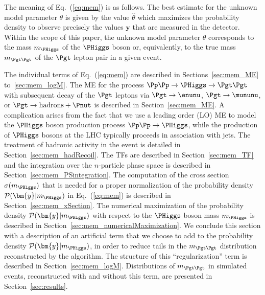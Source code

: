 The meaning of Eq.~(\ref{eq:mem}) is as follows.
The best estimate for the unknown model parameter $\theta$ is given by the
value $\hat{\theta}$ which maximizes the probability density to observe precisely the 
values $\bm{y}$ that are measured in the detector. 
Within the scope of this paper, the unknown model parameter $\theta$
corresponds to the mass $m_{\PHiggs}$ of the $\PHiggs$ boson or,
equivalently, to the true mass $m_{\Pgt\Pgt}$ of the $\Pgt$ lepton
pair in a given event.

The individual terms of Eq.~(\ref{eq:mem}) are described in
Sections~\ref{sec:mem_ME} to~\ref{sec:mem_logM}.
The ME for the process $\Pp\Pp \to \PHiggs \to \Pgt\Pgt$
with subsequent decay of the $\Pgt$ leptons 
via $\Pgt \to \enunu$, $\Pgt \to \mununu$, or $\Pgt \to \textrm{hadrons} + \Pnut$
is described in Section~\ref{sec:mem_ME}.
A complication arises from the fact that we use a leading order (LO)
ME to model the $\PHiggs$ boson production process $\Pp\Pp \to
\PHiggs$, while the production of $\PHiggs$ bosons at the LHC typically
proceeds in association with jets.
The treatment of hadronic activity in the event is detailed in Section~\ref{sec:mem_hadRecoil}.
The TFs are described in Section~\ref{sec:mem_TF} and
the integration over the $n$-particle phase space is described in
Section~\ref{sec:mem_PSintegration}.
The computation of the cross section $\sigma(m_{\PHiggs})$ that is needed for a proper normalization of the probability density $\mathcal{P}(\bm{y}|m_{\PHiggs})$
in Eq.~(\ref{eq:mem}) is described in Section~\ref{sec:mem_xSection}.
The numerical maximization of the probability density $\mathcal{P}(\bm{y}|m_{\PHiggs})$
with respect to the $\PHiggs$ boson mass $m_{\PHiggs}$ is described in
Section~\ref{sec:mem_numericalMaximization}.
We conclude this section with a description of an artificial term that we
choose to add to the probability density $\mathcal{P}(\bm{y}|m_{\PHiggs})$, in
order to reduce tails in the $m_{\Pgt\Pgt}$ distribution reconstructed
by the algorithm. The structure of this ``regularization'' term is described in
Section~\ref{sec:mem_logM}.
Distributions of $m_{\Pgt\Pgt}$ in simulated events,
reconstructed with and without this term, are presented in Section~\ref{sec:results}.



